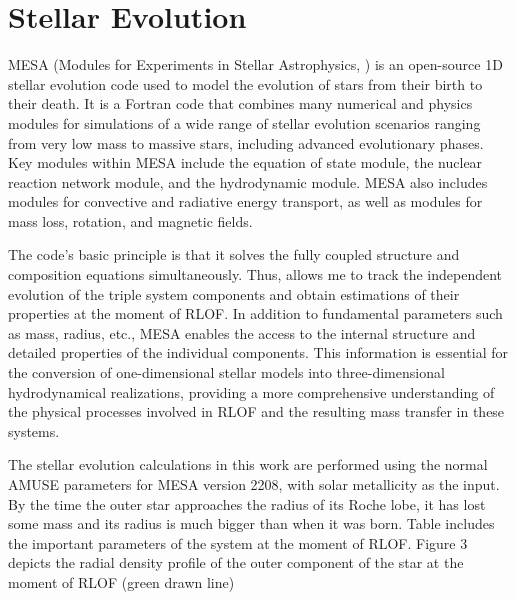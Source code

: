 \section{Stellar Evolution}

MESA (Modules for Experiments in Stellar Astrophysics, \cite{paxton2010modules,paxton2013modules,paxton2015modules,paxton2019modules}) is an open-source 1D stellar evolution code used to model the evolution of stars from their birth to their death. It is a Fortran code that combines many numerical and physics modules for simulations of a wide range of stellar evolution scenarios ranging from very low mass to massive stars, including advanced evolutionary phases. Key modules within MESA include the equation of state module, the nuclear reaction network module, and the hydrodynamic module. MESA also includes modules for convective and radiative energy transport, as well as modules for mass loss, rotation, and magnetic fields. 

The code's basic principle is that it solves the fully coupled structure and composition equations simultaneously. Thus, allows me to track the independent evolution of the triple system components and obtain estimations of their properties at the moment of RLOF. In addition to fundamental parameters such as mass, radius, etc., MESA enables the access to the internal structure and detailed properties of the individual components. This information is essential for the conversion of one-dimensional stellar models into three-dimensional hydrodynamical realizations, providing a more comprehensive understanding of the physical processes involved in RLOF and the resulting mass transfer in these systems.

The stellar evolution calculations in this work are performed using the normal AMUSE parameters for MESA version 2208, with solar metallicity as the input. By the time the outer star approaches the radius of its Roche lobe, it has lost some mass and its radius is much bigger than when it was born. Table includes the important parameters of the system at the moment of RLOF. Figure 3 depicts the radial density profile of the outer component of the star at the moment of RLOF (green drawn line)



